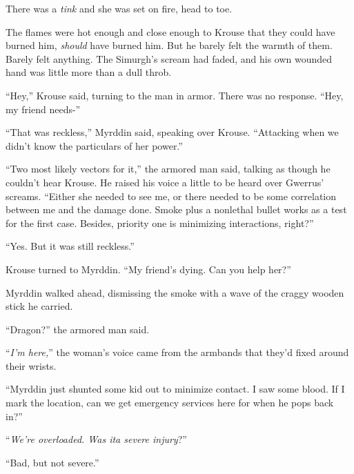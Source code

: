 There was a \emph{tink }and she was set on fire, head to toe.



The flames were hot enough and close enough to Krouse that they could have burned him, \emph{should} have burned him.  But he barely felt the warmth of them.  Barely felt anything.  The Simurgh's scream had faded, and his own wounded hand was little more than a dull throb.



``Hey,'' Krouse said, turning to the man in armor.  There was no response.  ``Hey, my friend needs-''



``That was reckless,'' Myrddin said, speaking over Krouse.  ``Attacking when we didn't know the particulars of her power.''



``Two most likely vectors for it,'' the armored man said, talking as though he couldn't hear Krouse.  He raised his voice a little to be heard over Gwerrus' screams.  ``Either she needed to see me, or there needed to be some correlation between me and the damage done.  Smoke plus a nonlethal bullet works as a test for the first case.  Besides, priority one is minimizing interactions, right?''



``Yes.  But it was still reckless.''



Krouse turned to Myrddin.  ``My friend's dying.  Can you help her?''



Myrddin walked ahead, dismissing the smoke with a wave of the craggy wooden stick he carried.



``Dragon?'' the armored man said.



``\emph{I'm here,}'' the woman's voice came from the armbands that they'd fixed around their wrists.



``Myrddin just shunted some kid out to minimize contact.  I saw some blood.  If I mark the location, can we get emergency services here for when he pops back in?''



``\emph{We're overloaded.  Was it}\emph{a severe injury}?''



``Bad, but not severe.''



